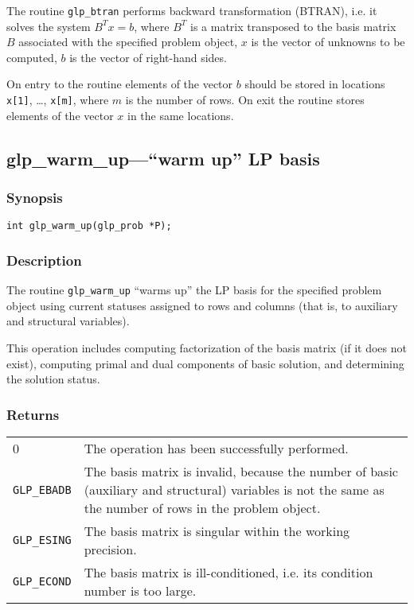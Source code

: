 The routine \verb|glp_btran| performs backward transformation (BTRAN),
i.e. it solves the system $B^Tx=b$, where $B^T$ is a matrix transposed
to the basis matrix $B$ associated with the specified problem object,
$x$ is the vector of unknowns to be computed, $b$ is the vector of
right-hand sides.

On entry to the routine elements of the vector $b$ should be stored in
locations \verb|x[1]|, \dots, \verb|x[m]|, where $m$ is the number of
rows. On exit the routine stores elements of the vector $x$ in the same
locations.


\newpage

\subsection{glp\_warm\_up---``warm up'' LP basis}

\subsubsection*{Synopsis}

\begin{verbatim}
int glp_warm_up(glp_prob *P);
\end{verbatim}

\subsubsection*{Description}

The routine \verb|glp_warm_up| ``warms up'' the LP basis for the
specified problem object using current statuses assigned to rows and
columns (that is, to auxiliary and structural variables).

This operation includes computing factorization of the basis matrix
(if it does not exist), computing primal and dual components of basic
solution, and determining the solution status.

\subsubsection*{Returns}

\begin{tabular}{@{}p{25mm}p{97.3mm}@{}}
0 & The operation has been successfully performed.\\
\verb|GLP_EBADB| & The basis matrix is invalid, because the number of
basic (auxiliary and structural) variables is not the same as the number
of rows in the problem object.\\
\verb|GLP_ESING| & The basis matrix is singular within the working
precision.\\
\verb|GLP_ECOND| & The basis matrix is ill-conditioned, i.e. its
condition number is too large.\\
\end{tabular}

